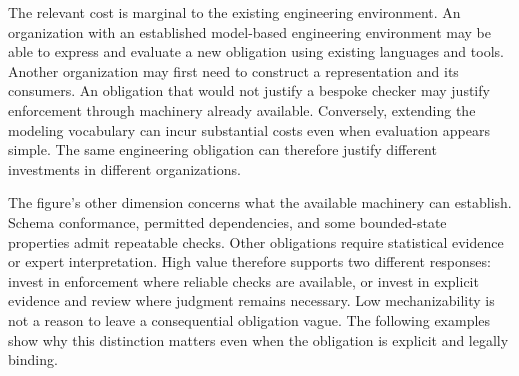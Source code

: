 The relevant cost is marginal to the existing engineering environment. An organization with an established model-based engineering environment may be able to express and evaluate a new obligation using existing languages and tools. Another organization may first need to construct a representation and its consumers. An obligation that would not justify a bespoke checker may justify enforcement through machinery already available. Conversely, extending the modeling vocabulary can incur substantial costs even when evaluation appears simple. The same engineering obligation can therefore justify different investments in different organizations.


The figure's other dimension concerns what the available machinery can establish. Schema conformance, permitted dependencies, and some bounded-state properties admit repeatable checks. Other obligations require statistical evidence or expert interpretation. High value therefore supports two different responses: invest in enforcement where reliable checks are available, or invest in explicit evidence and review where judgment remains necessary. Low mechanizability is not a reason to leave a consequential obligation vague. The following examples show why this distinction matters even when the obligation is explicit and legally binding.





